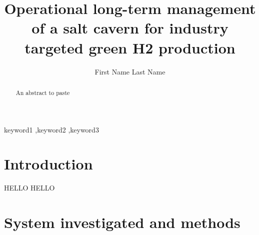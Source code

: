 \documentclass[authoryear,preprint,12pt]{elsarticle}
\begin{document}
\title{Operational long-term management of a salt cavern for industry targeted green H2 production}

\author{First Name Last Name}

\address{Paris-Saclay University}

\begin{abstract}
    An abstract to paste
\end{abstract}

\begin{keyword}
keyword1 \sep keyword2 \sep keyword3
\end{keyword}

\maketitle

\clearpage
\section{Introduction}
\label{Intro}

HELLO HELLO




\section{System investigated and methods}


\clearpage
\appendix







\end{document}
